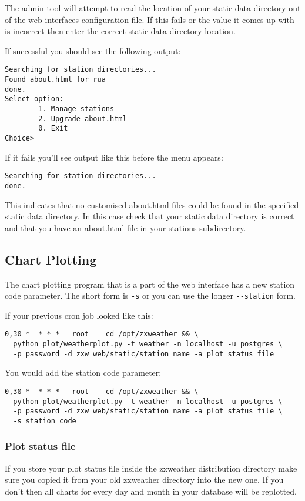 \documentclass[a4paper,10pt,draft]{book}
\begin{document}
The admin tool will attempt to read the location of your static data directory out of the web interfaces configuration file. If this fails or the value it comes up with is incorrect then enter the correct static data directory location.

If successful you should see the following output:
\begin{verbatim}
Searching for station directories...
Found about.html for rua
done.
Select option:
        1. Manage stations
        2. Upgrade about.html
        0. Exit
Choice>
\end{verbatim}

If it fails you'll see output like this before the menu appears:
\begin{verbatim}
Searching for station directories...
done.
\end{verbatim}
This indicates that no customised about.html files could be found in the specified static data directory. In this case check that your static data directory is correct and that you have an about.html file in your stations subdirectory.

\subsection{Chart Plotting}
The chart plotting program that is a part of the web interface has a new station code parameter. The short form is \verb|-s| or you can use the longer \verb|--station| form.

If your previous cron job looked like this:
\begin{verbatim}
0,30 *  * * *   root    cd /opt/zxweather && \
  python plot/weatherplot.py -t weather -n localhost -u postgres \
  -p password -d zxw_web/static/station_name -a plot_status_file
\end{verbatim}

You would add the station code parameter:
\begin{verbatim}
0,30 *  * * *   root    cd /opt/zxweather && \
  python plot/weatherplot.py -t weather -n localhost -u postgres \
  -p password -d zxw_web/static/station_name -a plot_status_file \
  -s station_code
\end{verbatim}

\subsubsection{Plot status file}
If you store your plot status file inside the zxweather distribution directory make sure you copied it from your old zxweather directory into the new one. If you don't then all charts for every day and month in your database will be replotted.
\end{document}
